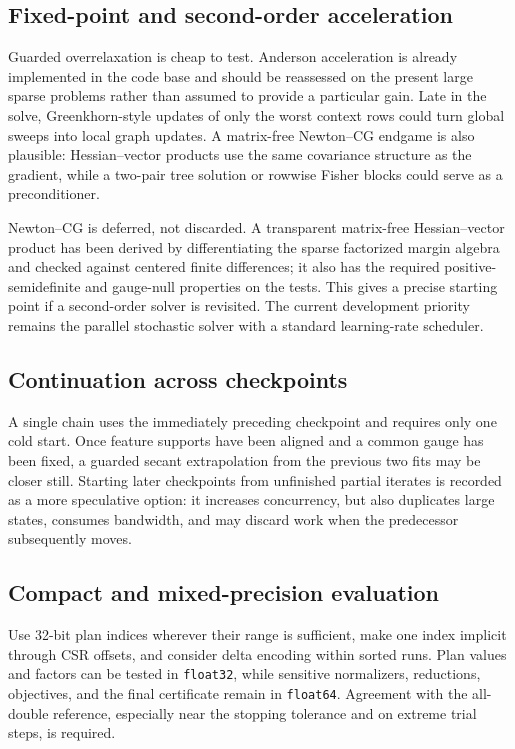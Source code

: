\documentclass[11pt]{article}
\begin{document}
\subsection{Fixed-point and second-order acceleration}

Guarded overrelaxation is cheap to test.  Anderson acceleration is already
implemented in the code base and should be reassessed on the present large
sparse problems rather than assumed to provide a particular gain.  Late in
the solve, Greenkhorn-style updates of only the worst context rows could turn
global sweeps into local graph updates.  A matrix-free Newton--CG endgame is
also plausible: Hessian--vector products use the same covariance structure as
the gradient, while a two-pair tree solution or rowwise Fisher blocks could
serve as a preconditioner.

Newton--CG is deferred, not discarded.  A transparent matrix-free
Hessian--vector product has been derived by differentiating the sparse
factorized margin algebra and checked against centered finite differences;
it also has the required positive-semidefinite and gauge-null properties on
the tests.  This gives a precise starting point if a second-order solver is
revisited.  The current development priority remains the parallel stochastic
solver with a standard learning-rate scheduler.

\subsection{Continuation across checkpoints}

A single chain uses the immediately preceding checkpoint and requires only
one cold start.  Once feature supports have been aligned and a common gauge
has been fixed, a guarded secant extrapolation from the previous two fits may
be closer still.  Starting later checkpoints from unfinished partial iterates
is recorded as a more speculative option: it increases concurrency, but also
duplicates large states, consumes bandwidth, and may discard work when the
predecessor subsequently moves.

\subsection{Compact and mixed-precision evaluation}

Use 32-bit plan indices wherever their range is sufficient, make one index
implicit through CSR offsets, and consider delta encoding within sorted runs.
Plan values and factors can be tested in \texttt{float32}, while sensitive
normalizers, reductions, objectives, and the final certificate remain in
\texttt{float64}.  Agreement with the all-double reference, especially near
the stopping tolerance and on extreme trial steps, is required.
\end{document}
